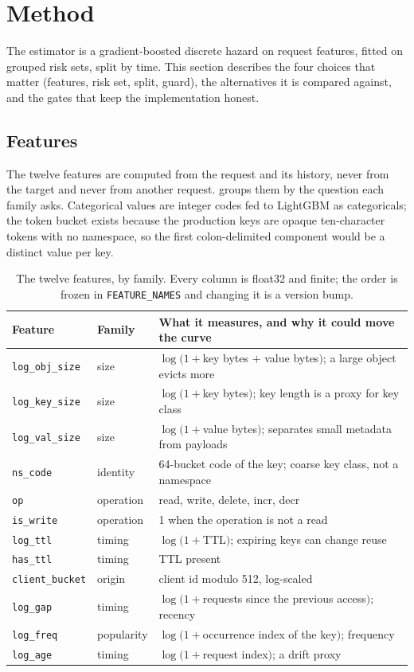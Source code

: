 \section{Method}
\label{sec:methods}

The estimator is a gradient-boosted discrete hazard on request features, fitted on
grouped risk sets, split by time. This section describes the four choices that
matter (features, risk set, split, guard), the alternatives it is compared against,
and the gates that keep the implementation honest.

\subsection{Features}
\label{sec:features}

The twelve features are computed from the request and its history, never from the
target and never from another request.  groups them by the
question each family asks. Categorical values are integer codes fed to LightGBM as
categoricals; the token bucket exists because the production keys are opaque
ten-character tokens with no namespace, so the first colon-delimited component
would be a distinct value per key.

\begin{table}[t]
\centering
\footnotesize
\caption{The twelve features, by family. Every column is float32 and finite; the
order is frozen in \texttt{FEATURE\_NAMES} and changing it is a version bump.}
\label{tab:features}
\begin{tabular}{@{}l l l@{}}
\toprule
Feature & Family & What it measures, and why it could move the curve \\
\midrule
\texttt{log\_obj\_size} & size & $\log(1+$key bytes $+$ value bytes$)$; a large object evicts more \\
\texttt{log\_key\_size} & size & $\log(1+$key bytes$)$; key length is a proxy for key class \\
\texttt{log\_val\_size} & size & $\log(1+$value bytes$)$; separates small metadata from payloads \\
\texttt{ns\_code} & identity & 64-bucket code of the key; coarse key class, not a namespace \\
\texttt{op} & operation & read, write, delete, incr, decr \\
\texttt{is\_write} & operation & 1 when the operation is not a read \\
\texttt{log\_ttl} & timing & $\log(1+$TTL$)$; expiring keys can change reuse \\
\texttt{has\_ttl} & timing & TTL present \\
\texttt{client\_bucket} & origin & client id modulo 512, log-scaled \\
\texttt{log\_gap} & timing & $\log(1+$requests since the previous access$)$; recency \\
\texttt{log\_freq} & popularity & $\log(1+$occurrence index of the key$)$; frequency \\
\texttt{log\_age} & timing & $\log(1+$request index$)$; a drift proxy \\
\bottomrule
\end{tabular}
\end{table}

